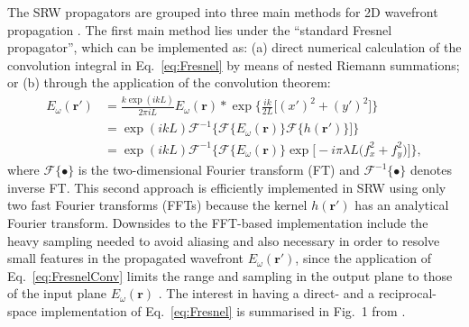 \documentclass{iucr}              %
\begin{document}
 The SRW propagators are grouped into three main methods for 2D wavefront propagation \cite{SRWgit}. The first main method lies under the ``standard Fresnel propagator'', which can be implemented as: (a) direct numerical calculation of the convolution integral in Eq.~\ref{eq:Fresnel} by means of nested Riemann summations; or (b) through the application of the convolution theorem:
 \begin{equation}\label{eq:FresnelConv}
\begin{split}
    E_\omega(\textbf{r}')&=\frac{k\exp{(ikL)}}{2\pi i L} E_\omega(\textbf{r}) * \exp{\bigg\{ \frac{ik}{2L}\big[ (x')^2 + (y')^2 \big]\bigg\}}\\
   &= \exp{(ikL)}\mathcal{F}^{-1}\big\{\mathcal{F}\{E_\omega(\textbf{r})\}\mathcal{F}\{h(\textbf{r}')\}\big]\}\\
   &=\exp{(ikL)}\mathcal{F}^{-1}\big\{\mathcal{F}\{E_\omega(\textbf{r})\}\exp\big[-i\pi\lambda L\big(f_x^2+f_y^2\big)\big]\},
\end{split}
\end{equation}
where $\mathcal{F}\{\bullet\}$ is the two-dimensional Fourier transform (FT) and $\mathcal{F}^{-1}\{\bullet\}$ denotes inverse FT. This second approach is efficiently implemented in SRW using only two fast Fourier transforms (FFTs) because the kernel $h(\textbf{r}')$ has an analytical Fourier transform. Downsides to the FFT-based implementation include the heavy sampling needed to avoid aliasing and also necessary in order to resolve small features in the propagated wavefront $ E_\omega(\textbf{r}')$, since the application of Eq.~\ref{eq:FresnelConv} limits the range and sampling in the output plane to those of the input plane $ E_\omega(\textbf{r})$ \cite{Kelly2014}. The interest in having a direct- and a reciprocal-space implementation of Eq.~\ref{eq:Fresnel} is summarised in Fig.~1 from \cite{Li2015}.
\end{document}
